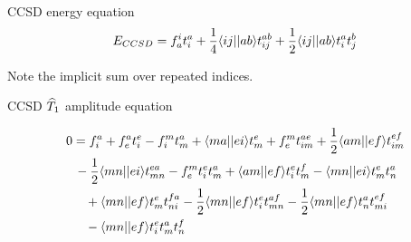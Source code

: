 









\begin{frame}{CCSD energy equation }
    \begin{equation*}
    E_{CCSD} = 
    f_a^i t_i^a + \frac{1}{4} \langle ij||ab\rangle t_{ij}^{ab} + \frac{1}{2} \langle ij||ab\rangle  t_i^a  t_j^b
\end{equation*}

Note the implicit sum over repeated indices.



\end{frame}

    







\begin{frame}{CCSD $\widehat{T}_1$ amplitude equation }

\begin{align*}
    0 &= f_{i}^a + f_{e}^a t_i^e - f_{i}^mt_m^a + \langle ma||ei\rangle t_m^e 
        + f_{e}^m t_{im}^{ae} + \frac{1}{2} \langle am||ef\rangle t_{im}^{ef} \\
        &\, - \frac{1}{2} \langle mn||ei\rangle t_{mn}^{ea} - f_{e}^m t_i^e t_m^a
        + \langle am||ef\rangle t_i^e t_m^f - \langle mn||ei\rangle t_m^e t_n^a  \\
        & \quad + \langle mn||ef\rangle t_m^e t_{ni}^{fa}
        - \frac{1}{2} \langle mn||ef\rangle t_i^e t_{mn}^{af}
        - \frac{1}{2} \langle mn||ef\rangle t_n^a t_{mi}^{ef}\\
        & \quad  - \langle mn||ef\rangle t_i^e t_m^a t_n^f
\end{align*}


\end{frame}

    


